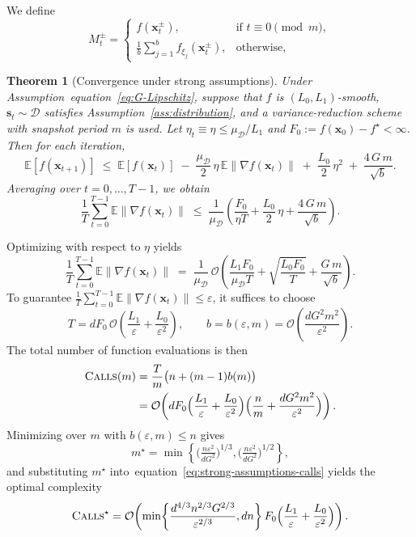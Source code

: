 \documentclass[twoside]{article}
\theoremstyle{plain}
\newtheorem{theorem}[lemma]{Theorem}
\theoremstyle{definition}
\theoremstyle{remark}
\def\eqref#1{equation~\ref{#1}}
\def\cO{{\mathcal{O}}}
\def\cD{{\mathcal{D}}}
\def\vs{{\bm{s}}}
\def\vx{{\bm{x}}}
\newcommand{\E}{\mathbb{E}}
\begin{document}
We define
\[
   M_t^\pm =
   \begin{cases}
      f(\vx_t^\pm), & \text{if } t \equiv 0 \pmod{m}, \\[6pt]
      \tfrac{1}{b}\sum_{j=1}^b f_{\xi_j}(\vx_t^\pm),
      & \text{otherwise},
   \end{cases}
\]
\begin{propbox}
\begin{theorem}[Convergence under strong assumptions]
\label{thm:strong-assumptions}
Under Assumption~\eqref{eq:G-Lipschitz}, suppose that
$f$ is $(L_0,L_1)$-smooth, $\vs_t\sim\cD$ satisfies
Assumption~\ref{ass:distribution}, and a variance-reduction scheme with
snapshot period $m$ is used.  
Let $\eta_t\equiv\eta\le \mu_\cD/L_1$ and
$F_0:=f(\vx_0)-f^\star<\infty$. Then for each iteration,
\begin{equation}
\label{eq:strong-assumptions-one-step}
\E[f(\vx_{t+1})]
\;\le\;
\E[f(\vx_t)]
\;-\;\frac{\mu_{\cD}}{2}\,\eta\,\E\|\nabla f(\vx_t)\|
\;+\;\frac{L_0}{2}\,\eta^2
\;+\;\frac{4\,G\,m}{\sqrt{b}}.
\end{equation}
Averaging over $t=0,\dots,T-1$, we obtain
\begin{equation}
\label{eq:strong-assumptions-avg}
\frac{1}{T}\sum_{t=0}^{T-1}\E\|\nabla f(\vx_t)\|
\;\le\;
\frac{1}{\mu_{\cD}}
\left(
  \frac{F_0}{\eta T}
  + \frac{L_0}{2}\,\eta
  + \frac{4\,G\,m}{\sqrt{b}}
\right).
\end{equation}
\end{theorem}
\end{propbox}
Optimizing with respect to $\eta$ yields
\begin{equation}
\label{eq:strong-assumptions-optimized}
\frac{1}{T}\sum_{t=0}^{T-1}\E\|\nabla f(\vx_t)\|
\;=\;
\frac{1}{\mu_{\cD}}\,
\cO\!\left(
  \frac{L_1 F_0}{\mu_{\cD} T}
  + \sqrt{\frac{L_0 F_0}{T}}
  + \frac{G\,m}{\sqrt{b}}
\right).
\end{equation}
To guarantee
$\tfrac{1}{T}\sum_{t=0}^{T-1}\E\|\nabla f(\vx_t)\|\le\varepsilon$, it suffices to choose
\[
T = d F_0\,\cO\!\left(\frac{L_1}{\varepsilon} + \frac{L_0}{\varepsilon^2}\right),
\qquad
b=b(\varepsilon,m)=\cO\!\left(\frac{d G^2 m^2}{\varepsilon^2}\right).
\]
The total number of function evaluations is then
\begin{align}
\textsc{Calls}(m)
&= \frac{T}{m}\big(n + (m-1)b(m)\big) \notag\\
&= \cO\!\left(
    d F_0
    \Big(\frac{L_1}{\varepsilon} + \frac{L_0}{\varepsilon^2}\Big)
    \Big(\frac{n}{m} + \frac{d G^2 m^2}{\varepsilon^2}\Big)
\right).
\label{eq:strong-assumptions-calls}
\end{align}
Minimizing over $m$ with $b(\varepsilon,m)\le n$ gives
\[
    m^\star
    =
    \min\!\left\{
      \Big(\tfrac{n\varepsilon^2}{d G^2}\Big)^{1/3},
      \Big(\tfrac{n\varepsilon^2}{d G^2}\Big)^{1/2}
    \right\},
\]
and substituting $m^\star$ into~\eqref{eq:strong-assumptions-calls} yields the
optimal complexity
\begin{equation}
\label{eq:strong-assumptions-final}
\textsc{Calls}^\star
= \cO\!\left(
  \min\!\left\{
    \frac{d^{4/3} n^{2/3} G^{2/3}}{\varepsilon^{2/3}},
    d n
  \right\}
  F_0
  \Big(\frac{L_1}{\varepsilon} + \frac{L_0}{\varepsilon^2}\Big)
\right).
\end{equation}
\end{document}
